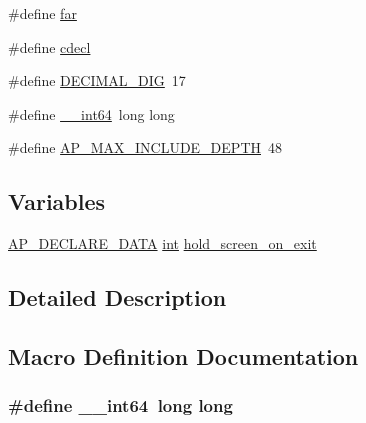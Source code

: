 \begin{DoxyCompactItemize}
$$\#define \hyperlink{group__APACHE__OS__NETWARE_ga0996c29b5fdd7baa181e30274b2378b7}{far}
\item 
\#define \hyperlink{group__APACHE__OS__NETWARE_gab673f0471cc5a794ed4ed9a6195a4330}{cdecl}
\item 
\#define \hyperlink{group__APACHE__OS__NETWARE_ga4cf64e8adc22248633d97b94e77760d3}{D\+E\+C\+I\+M\+A\+L\+\_\+\+D\+IG}~17
\item 
\#define \hyperlink{group__APACHE__OS__NETWARE_gaa254d9bac3ece6a9d99def539e8a80eb}{\+\_\+\+\_\+int64}~long long
\item 
\#define \hyperlink{group__APACHE__OS__NETWARE_gae9a2111b95072187b90f7dd5c4b16adb}{A\+P\+\_\+\+M\+A\+X\+\_\+\+I\+N\+C\+L\+U\+D\+E\+\_\+\+D\+E\+P\+TH}~48
\end{DoxyCompactItemize}
\subsection*{Variables}
\begin{DoxyCompactItemize}
\item 
\hyperlink{ap__config_8h_a0bb4c3adf74510a0dcdad5b125725fe0}{A\+P\+\_\+\+D\+E\+C\+L\+A\+R\+E\+\_\+\+D\+A\+TA} \hyperlink{pcre_8txt_a42dfa4ff673c82d8efe7144098fbc198}{int} \hyperlink{group__APACHE__OS__NETWARE_ga8cb457878fc498ef805d17ebc17c9429}{hold\+\_\+screen\+\_\+on\+\_\+exit}
\end{DoxyCompactItemize}


\subsection{Detailed Description}


\subsection{Macro Definition Documentation}
\subsubsection[{\texorpdfstring{\+\_\+\+\_\+int64}{__int64}}]{\setlength{\rightskip}{0pt plus 5cm}\#define \+\_\+\+\_\+int64~long long}\hypertarget{group__APACHE__OS__NETWARE_gaa254d9bac3ece6a9d99def539e8a80eb}{}\label{group__APACHE__OS__NETWARE_gaa254d9bac3ece6a9d99def539e8a80eb}
